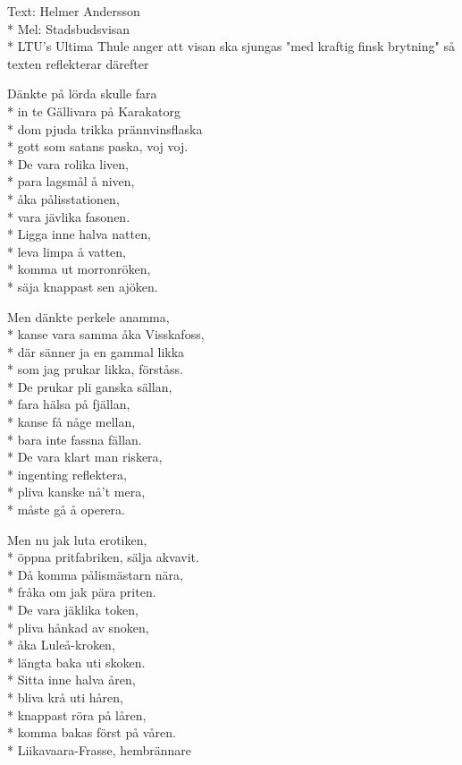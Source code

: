 \begin{SongText}[Gällivarevisan]
\begin{SongInfo}
    Text: Helmer Andersson\\*%
    Mel:  Stadsbudsvisan\\*%
    LTU's Ultima Thule anger att visan ska sjungas "med kraftig finsk brytning" så texten reflekterar därefter
\end{SongInfo}
\begin{SongVerse}
Dänkte på lörda skulle fara\\*%
in te Gällivara på Karakatorg\\*%
dom pjuda trikka prännvinsflaska\\*%
gott som satans paska, voj voj.\\*%
De vara rolika liven,\\*%
para lagsmål å niven,\\*%
åka pålisstationen,\\*%
vara jävlika fasonen.\\*%
Ligga inne halva natten,\\*%
leva limpa å vatten,\\*%
komma ut morronröken,\\*%
säja knappast sen ajöken.
\end{SongVerse}
\begin{SongVerse}
Men dänkte perkele anamma,\\*%
kanse vara samma åka Visskafoss,\\*%
där sänner ja en gammal likka\\*%
som jag prukar likka, förståss.\\*%
De prukar pli ganska sällan,\\*%
fara hälsa på fjällan,\\*%
kanse få någe mellan,\\*%
bara inte fassna fällan.\\*%
De vara klart man riskera,\\*%
ingenting reflektera,\\*%
pliva kanske nå’t mera,\\*%
måste gå å operera.
\end{SongVerse}
\begin{SongVerse}
Men nu jak luta erotiken,\\*%
öppna pritfabriken, sälja akvavit.\\*%
Då komma pålismästarn nära,\\*%
fråka om jak pära priten.\\*%
De vara jäklika token,\\*%
pliva hånkad av snoken,\\*%
åka Luleå-kroken,\\*%
längta baka uti skoken.\\*%
Sitta inne halva åren,\\*%
bliva krå uti håren,\\*%
knappast röra på låren,\\*%
komma bakas först på våren.\\*%
Liikavaara-Frasse, hembrännare
\end{SongVerse}
\end{SongText}
